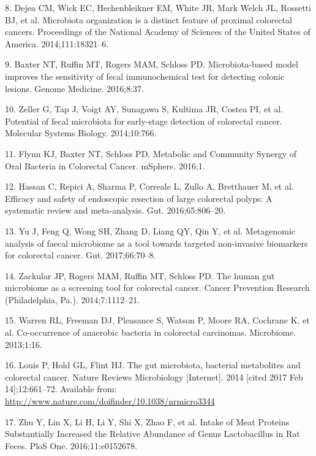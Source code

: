 \documentclass[12pt,]{article}
\begin{document}
\hypertarget{ref-dejea_microbiota_2014}{}
8. Dejea CM, Wick EC, Hechenbleikner EM, White JR, Mark Welch JL,
Rossetti BJ, et al. Microbiota organization is a distinct feature of
proximal colorectal cancers. Proceedings of the National Academy of
Sciences of the United States of America. 2014;111:18321--6.

\hypertarget{ref-baxter_microbiota-based_2016}{}
9. Baxter NT, Ruffin MT, Rogers MAM, Schloss PD. Microbiota-based model
improves the sensitivity of fecal immunochemical test for detecting
colonic lesions. Genome Medicine. 2016;8:37.

\hypertarget{ref-zeller_potential_2014}{}
10. Zeller G, Tap J, Voigt AY, Sunagawa S, Kultima JR, Costea PI, et al.
Potential of fecal microbiota for early-stage detection of colorectal
cancer. Molecular Systems Biology. 2014;10:766.

\hypertarget{ref-flynn_metabolic_2016}{}
11. Flynn KJ, Baxter NT, Schloss PD. Metabolic and Community Synergy of
Oral Bacteria in Colorectal Cancer. mSphere. 2016;1.

\hypertarget{ref-hassan_efficacy_2016}{}
12. Hassan C, Repici A, Sharma P, Correale L, Zullo A, Bretthauer M, et
al. Efficacy and safety of endoscopic resection of large colorectal
polyps: A systematic review and meta-analysis. Gut. 2016;65:806--20.

\hypertarget{ref-yu_metagenomic_2017}{}
13. Yu J, Feng Q, Wong SH, Zhang D, Liang QY, Qin Y, et al. Metagenomic
analysis of faecal microbiome as a tool towards targeted non-invasive
biomarkers for colorectal cancer. Gut. 2017;66:70--8.

\hypertarget{ref-zackular_human_2014}{}
14. Zackular JP, Rogers MAM, Ruffin MT, Schloss PD. The human gut
microbiome as a screening tool for colorectal cancer. Cancer Prevention
Research (Philadelphia, Pa.). 2014;7:1112--21.

\hypertarget{ref-warren_co-occurrence_2013}{}
15. Warren RL, Freeman DJ, Pleasance S, Watson P, Moore RA, Cochrane K,
et al. Co-occurrence of anaerobic bacteria in colorectal carcinomas.
Microbiome. 2013;1:16.

\hypertarget{ref-louis_gut_2014}{}
16. Louis P, Hold GL, Flint HJ. The gut microbiota, bacterial
metabolites and colorectal cancer. Nature Reviews Microbiology
{[}Internet{]}. 2014 {[}cited 2017 Feb 14{]};12:661--72. Available from:
\url{http://www.nature.com/doifinder/10.1038/nrmicro3344}

\hypertarget{ref-zhu_intake_2016}{}
17. Zhu Y, Lin X, Li H, Li Y, Shi X, Zhao F, et al. Intake of Meat
Proteins Substantially Increased the Relative Abundance of Genus
Lactobacillus in Rat Feces. PloS One. 2016;11:e0152678.
\end{document}
